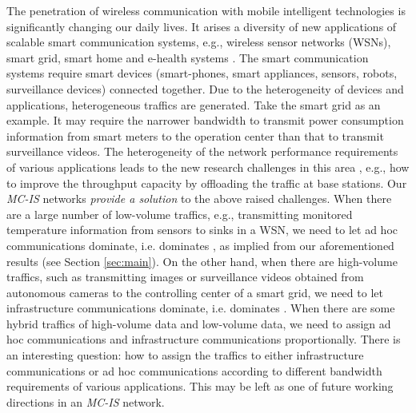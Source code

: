 \documentclass[10pt,journal]{IEEEtran}
\begin{document}
The penetration of wireless communication with mobile intelligent technologies is significantly changing our daily lives. It arises a diversity of new applications of scalable smart communication systems, e.g., wireless sensor networks (WSNs), smart grid, smart home and e-health systems \cite{YZhang:IEEENet12,YYan:TCST13}. The smart communication systems require smart devices (smart-phones, smart appliances, sensors, robots, surveillance devices) connected together. Due to the heterogeneity of devices and applications, heterogeneous traffics are generated. Take the smart grid as an example. It may require the narrower bandwidth to transmit power consumption information from smart meters to the operation center than that to transmit surveillance videos. The heterogeneity of the network performance requirements of various applications leads to the new research challenges in this area \cite{Khorov:2015}, e.g., how to improve the throughput capacity by offloading the traffic at base stations. Our \textit{MC-IS} networks \emph{provide a solution} to the above raised challenges. When there are a large number of low-volume traffics, e.g., transmitting monitored temperature information from sensors to sinks in a WSN, we need to let ad hoc communications dominate, i.e.  dominates , as implied from our aforementioned results (see Section \ref{sec:main}). On the other hand, when there are high-volume traffics, such as transmitting images or surveillance videos obtained from autonomous cameras to the controlling center of a smart grid, we need to let infrastructure communications dominate, i.e.  dominates . When there are some hybrid traffics of high-volume data and low-volume data, we need to assign ad hoc communications and infrastructure communications proportionally. There is an interesting question: how to assign the traffics to either infrastructure communications or ad hoc communications according to different bandwidth requirements of various applications. This may be left as one of future working directions in an \textit{MC-IS} network.
\end{document}
